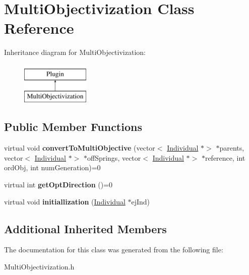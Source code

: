 \hypertarget{classMultiObjectivization}{}\section{Multi\+Objectivization Class Reference}
\label{classMultiObjectivization}
Inheritance diagram for Multi\+Objectivization\+:\begin{figure}[H]
\begin{center}
\leavevmode
\includegraphics[height=2.000000cm]{d8/db8/classMultiObjectivization}
\end{center}
\end{figure}
\subsection*{Public Member Functions}
\begin{DoxyCompactItemize}
\item 
\mbox{\label{classMultiObjectivization_a080d1d8aed13ed15918ec506779c03cd}} 
virtual void {\bfseries convert\+To\+Multi\+Objective} (vector$<$ \mbox{\hyperlink{classIndividual}{Individual}} $\ast$$>$ $\ast$parents, vector$<$ \mbox{\hyperlink{classIndividual}{Individual}} $\ast$$>$ $\ast$off\+Springs, vector$<$ \mbox{\hyperlink{classIndividual}{Individual}} $\ast$$>$ $\ast$reference, int ord\+Obj, int num\+Generation)=0
\item 
\mbox{\label{classMultiObjectivization_a95936caf2862903ac3e4026382afe7dd}} 
virtual int {\bfseries get\+Opt\+Direction} ()=0
\item 
\mbox{\label{classMultiObjectivization_afbd6118fbc372dd5f2a0a9f138e42af5}} 
virtual void {\bfseries initiallization} (\mbox{\hyperlink{classIndividual}{Individual}} $\ast$ej\+Ind)
\end{DoxyCompactItemize}
\subsection*{Additional Inherited Members}


The documentation for this class was generated from the following file\+:\begin{DoxyCompactItemize}
\item 
Multi\+Objectivization.\+h\end{DoxyCompactItemize}
